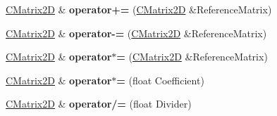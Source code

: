 \begin{DoxyCompactItemize}
\item 
\hyperlink{struct_c_matrix2_d}{C\+Matrix2D} \& {\bfseries operator+=} (\hyperlink{struct_c_matrix2_d}{C\+Matrix2D} \&Reference\+Matrix)\hypertarget{struct_c_matrix2_d_a0524f77a34a61f0789929cd2619857aa}{}\label{struct_c_matrix2_d_a0524f77a34a61f0789929cd2619857aa}

\item 
\hyperlink{struct_c_matrix2_d}{C\+Matrix2D} \& {\bfseries operator-\/=} (\hyperlink{struct_c_matrix2_d}{C\+Matrix2D} \&Reference\+Matrix)\hypertarget{struct_c_matrix2_d_ac1fa758e4b96f7da89b7df7c68b7d54e}{}\label{struct_c_matrix2_d_ac1fa758e4b96f7da89b7df7c68b7d54e}

\item 
\hyperlink{struct_c_matrix2_d}{C\+Matrix2D} \& {\bfseries operator$\ast$=} (\hyperlink{struct_c_matrix2_d}{C\+Matrix2D} \&Reference\+Matrix)\hypertarget{struct_c_matrix2_d_ae57c024d4dee37eaf8ad467e8e6edbe7}{}\label{struct_c_matrix2_d_ae57c024d4dee37eaf8ad467e8e6edbe7}

\item 
\hyperlink{struct_c_matrix2_d}{C\+Matrix2D} \& {\bfseries operator$\ast$=} (float Coefficient)\hypertarget{struct_c_matrix2_d_ab1915d2a4f1cd5a197216bea1a041ec3}{}\label{struct_c_matrix2_d_ab1915d2a4f1cd5a197216bea1a041ec3}

\item 
\hyperlink{struct_c_matrix2_d}{C\+Matrix2D} \& {\bfseries operator/=} (float Divider)\hypertarget{struct_c_matrix2_d_ab7835a34247ba7aa56a8c233fb4edf2e}{}\label{struct_c_matrix2_d_ab7835a34247ba7aa56a8c233fb4edf2e}


\end{DoxyCompactItemize}
